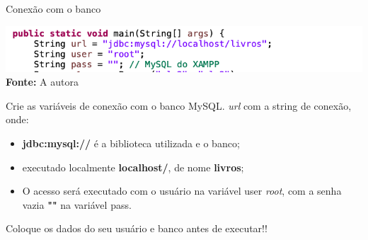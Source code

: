 \documentclass[11pt,aspectratio=43,ignorenonframetext,t]{beamer}
\begin{document}
\begin{frame}{Conexão com o banco}
\begin{center}
   \includegraphics[height=0.15\paperheight]{fig/aula22/main1.png} \\
    \tiny{\textbf{Fonte: }A autora}
 \end{center}
 \small Crie as variáveis de conexão com o banco MySQL. \textit{url} com a string de conexão, onde:
 \begin{itemize}
     \item \textbf{jdbc:mysql://} é a biblioteca utilizada e o banco;
     \item executado localmente \textbf{localhost/}, de nome \textbf{livros}; 
     \item O acesso será executado com o usuário na variável user \textit{root}, com a senha vazia \textbf{""} na variável pass.
 \end{itemize}
 Coloque os dados do seu usuário e banco antes de executar!! 
\end{frame}
\end{document}
